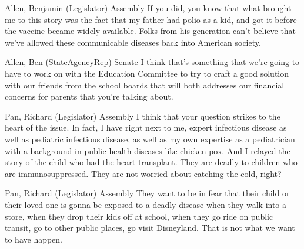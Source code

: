 \begin{result}{22.986796991743105}{Allen, Benjamin (Legislator) Assembly}
If you did, you know that what brought me to this story was the fact that my father had polio as a kid, and got it before the vaccine became widely available. Folks from his generation can't believe that we've allowed these communicable diseases back into American society.
\end{result}

\begin{result}{21.418011287112655}{Allen, Ben (StateAgencyRep) Senate}
I think that's something that we're going to have to work on with the Education Committee to try to craft a good solution with our friends from the school boards that will both addresses our financial concerns for parents that you're talking about.
\end{result}

\begin{result}{21.35821467691213}{Pan, Richard (Legislator) Assembly}
I think that your question strikes to the heart of the issue. In fact, I have right next to me, expert infectious disease as well as pediatric infectious disease, as well as my own expertise as a pediatrician with a background in public health diseases like chicken pox. And I relayed the story of the child who had the heart transplant. They are deadly to children who are immunosuppressed. They are not worried about catching the cold, right?
\end{result}

\begin{result}{20.625675994000698}{Pan, Richard (Legislator) Assembly}
They want to be in fear that their child or their loved one is gonna be exposed to a deadly disease when they walk into a store, when they drop their kids off at school, when they go ride on public transit, go to other public places, go visit Disneyland. That is not what we want to have happen.
\end{result}

